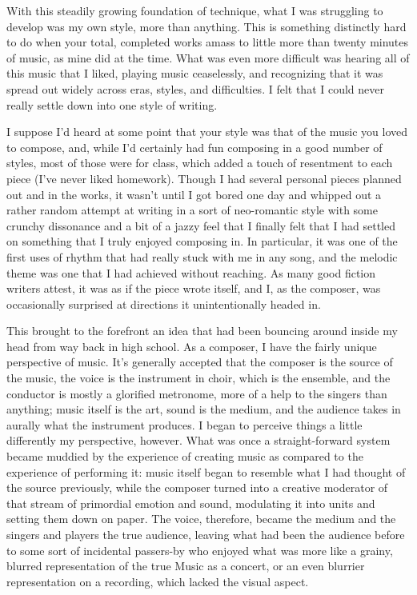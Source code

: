 \documentclass{book}
\begin{document}
With this steadily growing foundation of technique, what I was struggling to develop was my own style, more than anything.  This is something distinctly hard to do when your total, completed works amass to little more than twenty minutes of music, as mine did at the time.  What was even more difficult was hearing all of this music that I liked, playing music ceaselessly, and recognizing that it was spread out widely across eras, styles, and difficulties.  I felt that I could never really settle down into one style of writing.

I suppose I'd heard at some point that your style was that of the music you loved to compose, and, while I'd certainly had fun composing in a good number of styles, most of those were for class, which added a touch of resentment to each piece (I've never liked homework).  Though I had several personal pieces planned out and in the works, it wasn't until I got bored one day and whipped out a rather random attempt at writing in a sort of neo-romantic style with some crunchy dissonance and a bit of a jazzy feel that I finally felt that I had settled on something that I truly enjoyed composing in.  In particular, it was one of the first uses of rhythm that had really stuck with me in any song, and the melodic theme was one that I had achieved without reaching.  As many good fiction writers attest, it was as if the piece wrote itself, and I, as the composer, was occasionally surprised at directions it unintentionally headed in.

This brought to the forefront an idea that had been bouncing around inside my head from way back in high school.  As a composer, I have the fairly unique perspective of music.  It's generally accepted that the composer is the source of the music, the voice is the instrument in choir, which is the ensemble, and the conductor is mostly a glorified metronome, more of a help to the singers than anything; music itself is the art, sound is the medium, and the audience takes in aurally what the instrument produces.  I began to perceive things a little differently my perspective, however.  What was once a straight-forward system became muddied by the experience of creating music as compared to the experience of performing it: music itself began to resemble what I had thought of the source previously, while the composer turned into a creative moderator of that stream of primordial emotion and sound, modulating it into units and setting them down on paper.  The voice, therefore, became the medium and the singers and players the true audience, leaving what had been the audience before to some sort of incidental passers-by who enjoyed what was more like a grainy, blurred representation of the true Music as a concert, or an even blurrier representation on a recording, which lacked the visual aspect.
\end{document}
